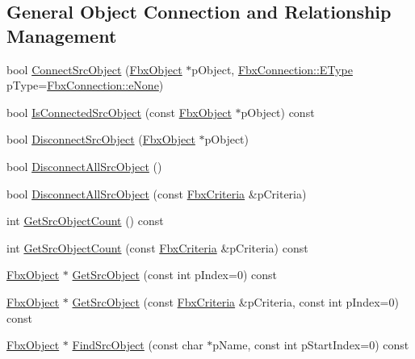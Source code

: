 \subsection*{General Object Connection and Relationship Management}
\begin{DoxyCompactItemize}
\item 
bool \hyperlink{class_fbx_property_ad6169eb703985c8a77f294442a03703d}{Connect\+Src\+Object} (\hyperlink{class_fbx_object}{Fbx\+Object} $\ast$p\+Object, \hyperlink{class_fbx_connection_a3df448a5db356652ab99fd2be2553749}{Fbx\+Connection\+::\+E\+Type} p\+Type=\hyperlink{class_fbx_connection_a3df448a5db356652ab99fd2be2553749a47aa04870c3c0769263e3972e67e9ebe}{Fbx\+Connection\+::e\+None})
\item 
bool \hyperlink{class_fbx_property_af4fc85f2c880d813903e158147aeeae4}{Is\+Connected\+Src\+Object} (const \hyperlink{class_fbx_object}{Fbx\+Object} $\ast$p\+Object) const
\item 
bool \hyperlink{class_fbx_property_aaf72d2b89f03e122cea736ca8e060cab}{Disconnect\+Src\+Object} (\hyperlink{class_fbx_object}{Fbx\+Object} $\ast$p\+Object)
\item 
bool \hyperlink{class_fbx_property_a7b9a767f964e705be7436739c5752644}{Disconnect\+All\+Src\+Object} ()
\item 
bool \hyperlink{class_fbx_property_a5535e9be6a48d8fd8fcb3a382067be8d}{Disconnect\+All\+Src\+Object} (const \hyperlink{class_fbx_criteria}{Fbx\+Criteria} \&p\+Criteria)
\item 
int \hyperlink{class_fbx_property_a4b6d431d87134722800f06e4cb442335}{Get\+Src\+Object\+Count} () const
\item 
int \hyperlink{class_fbx_property_ad90aa5b8d3fbe78a9bf541dcbcf9c210}{Get\+Src\+Object\+Count} (const \hyperlink{class_fbx_criteria}{Fbx\+Criteria} \&p\+Criteria) const
\item 
\hyperlink{class_fbx_object}{Fbx\+Object} $\ast$ \hyperlink{class_fbx_property_ade290835b0d88b978bc2566e255c5974}{Get\+Src\+Object} (const int p\+Index=0) const
\item 
\hyperlink{class_fbx_object}{Fbx\+Object} $\ast$ \hyperlink{class_fbx_property_ab7e0cadde56df774a9a52e24be2bcec9}{Get\+Src\+Object} (const \hyperlink{class_fbx_criteria}{Fbx\+Criteria} \&p\+Criteria, const int p\+Index=0) const
\item 
\hyperlink{class_fbx_object}{Fbx\+Object} $\ast$ \hyperlink{class_fbx_property_a9d65777042de1ee73b9e6635b12fe607}{Find\+Src\+Object} (const char $\ast$p\+Name, const int p\+Start\+Index=0) const

\end{DoxyCompactItemize}
